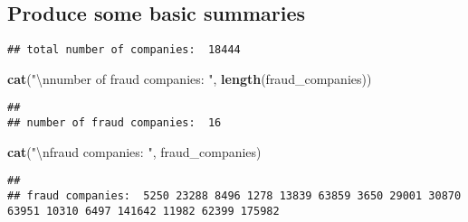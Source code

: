 \documentclass[
]{article}
\newenvironment{Shaded}{\begin{snugshade}}{\end{snugshade}}
\newcommand{\CharTok}[1]{\textcolor[rgb]{0.31,0.60,0.02}{#1}}
\newcommand{\CommentTok}[1]{\textcolor[rgb]{0.56,0.35,0.01}{\textit{#1}}}
\newcommand{\DecValTok}[1]{\textcolor[rgb]{0.00,0.00,0.81}{#1}}
\newcommand{\KeywordTok}[1]{\textcolor[rgb]{0.13,0.29,0.53}{\textbf{#1}}}
\newcommand{\NormalTok}[1]{#1}
\newcommand{\OperatorTok}[1]{\textcolor[rgb]{0.81,0.36,0.00}{\textbf{#1}}}
\newcommand{\StringTok}[1]{\textcolor[rgb]{0.31,0.60,0.02}{#1}}
\begin{document}
\hypertarget{produce-some-basic-summaries}{%
\subsection{Produce some basic
summaries}\label{produce-some-basic-summaries}}

\begin{Shaded}
\end{Shaded}

\begin{verbatim}
## total number of companies:  18444
\end{verbatim}

\begin{Shaded}
\begin{Highlighting}[]
        \KeywordTok{cat}\NormalTok{(}\StringTok{"}\CharTok{\textbackslash{}n}\StringTok{number of fraud companies: "}\NormalTok{, }\KeywordTok{length}\NormalTok{(fraud_companies))}
\end{Highlighting}
\end{Shaded}

\begin{verbatim}
## 
## number of fraud companies:  16
\end{verbatim}

\begin{Shaded}
\begin{Highlighting}[]
        \KeywordTok{cat}\NormalTok{(}\StringTok{"}\CharTok{\textbackslash{}n}\StringTok{fraud companies: "}\NormalTok{, fraud_companies)}
\end{Highlighting}
\end{Shaded}

\begin{verbatim}
## 
## fraud companies:  5250 23288 8496 1278 13839 63859 3650 29001 30870 63951 10310 6497 141642 11982 62399 175982
\end{verbatim}
\end{document}
